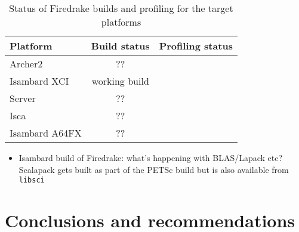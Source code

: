\documentclass[a4paper,titlepage]{article}
\begin{document}
\begin{table}[htp]
\begin{center}
\begin{tabular}{|l|c|c|}
\hline
Platform       &  Build status     & Profiling status \\
\hline
Archer2        &  ??               & \\
Isambard XCI   &  working build    & \\
Server         &  ??               & \\
Isca           &  ??               & \\
Isambard A64FX &  ??               & \\
\hline
\end{tabular}
\end{center}
\caption{Status of Firedrake builds and profiling for the target platforms}
\label{table:build_status}
\end{table}%

\begin{itemize}
\item Isambard build of Firedrake: what's happening with BLAS/Lapack etc? Scalapack gets built as part of the PETSc build but is also available from \texttt{libsci}
\end{itemize}



\section{Conclusions and recommendations}

\end{document}
